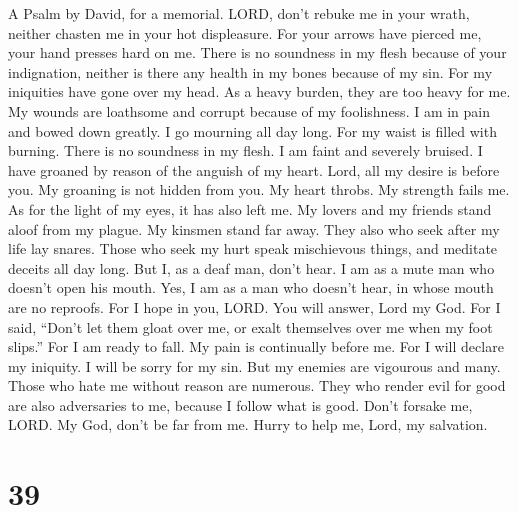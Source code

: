 A Psalm by David, for a memorial.  LORD, don't rebuke me in
your wrath, neither chasten me in your hot displeasure.  For
your arrows have pierced me, your hand presses hard on me. 
There is no soundness in my flesh because of your indignation, neither
is there any health in my bones because of my sin.  For my
iniquities have gone over my head. As a heavy burden, they are too heavy
for me.  My wounds are loathsome and corrupt because of my
foolishness.  I am in pain and bowed down greatly. I go
mourning all day long.  For my waist is filled with burning.
There is no soundness in my flesh.  I am faint and severely
bruised. I have groaned by reason of the anguish of my heart.
 Lord, all my desire is before you. My groaning is not
hidden from you.  My heart throbs. My strength fails me. As
for the light of my eyes, it has also left me.  My lovers
and my friends stand aloof from my plague. My kinsmen stand far away.
 They also who seek after my life lay snares. Those who
seek my hurt speak mischievous things, and meditate deceits all day
long.  But I, as a deaf man, don't hear. I am as a mute man
who doesn't open his mouth.  Yes, I am as a man who doesn't
hear, in whose mouth are no reproofs.  For I hope in you,
LORD. You will answer, Lord my God.  For I said, ``Don't
let them gloat over me, or exalt themselves over me when my foot
slips.''  For I am ready to fall. My pain is continually
before me.  For I will declare my iniquity. I will be sorry
for my sin.  But my enemies are vigourous and many. Those
who hate me without reason are numerous.  They who render
evil for good are also adversaries to me, because I follow what is good.
 Don't forsake me, LORD. My God, don't be far from me.
 Hurry to help me, Lord, my salvation.

\hypertarget{section-38}{%
\section{39}\label{section-38}}

